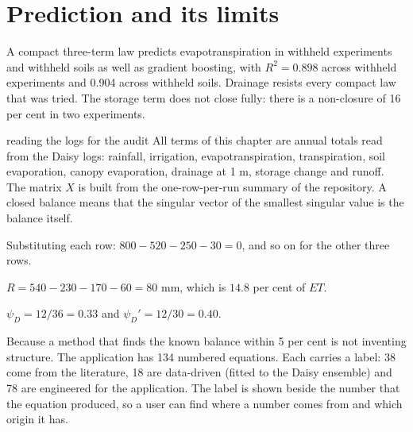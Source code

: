 


\section{Prediction and its limits}
A compact three-term law predicts evapotranspiration in withheld experiments and withheld soils as well as gradient boosting, with $R^2=0.898$ across withheld experiments and 0.904 across withheld soils. Drainage resists every compact law that was tried. The storage term does not close fully: there is a non-closure of 16 per cent in two experiments.

\begin{daisybox}{reading the logs for the audit}
All terms of this chapter are annual totals read from the Daisy logs: rainfall, irrigation, evapotranspiration, transpiration, soil evaporation, canopy evaporation, drainage at 1 m, storage change and runoff. The matrix $X$ is built from the one-row-per-run summary of the repository. A closed balance means that the singular vector of the smallest singular value is the balance itself.
\end{daisybox}

\sol {}\ans Substituting each row: $800-520-250-30=0$, and so on for the other three rows. \finans

\sol {}\ans $R=540-230-170-60=80$ mm, which is $14.8$ per cent of $ET$. \finans

\sol  $\psi_D=12/36=0.33$ and $\psi_D'=12/30=0.40$. \finans

\sol  Because a method that finds the known balance within 5 per cent is not inventing structure.
The application has 134 numbered equations. Each carries a label: 38 come from the literature, 18 are data-driven (fitted to the Daisy ensemble) and 78 are engineered for the application. The label is shown beside the number that the equation produced, so a user can find where a number comes from and which origin it has. \finans

